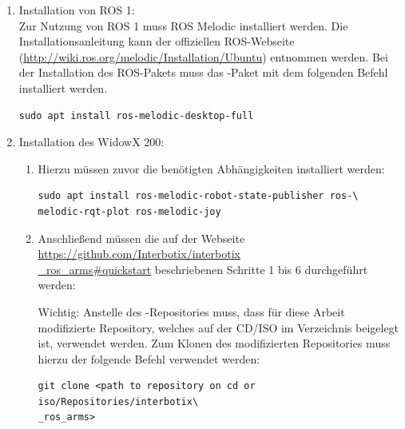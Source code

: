 \begin{enumerate}[label*=\arabic*.]
    \item Installation von ROS 1:\\
    Zur Nutzung von ROS 1 muss ROS Melodic installiert werden. Die Installationsanleitung kann der offiziellen ROS-Webseite (\href{http://wiki.ros.org/melodic/Installation/Ubuntu}{http://wiki.ros.org/melodic/Installation/Ubuntu}) entnommen werden. Bei der Installation des ROS-Pakets muss das -Paket mit dem folgenden Befehl installiert werden.

        \begin{lstlisting}[style=bash]
sudo apt install ros-melodic-desktop-full
        \end{lstlisting}

    \item Installation des WidowX 200:
        \begin{enumerate}[label*=\arabic*.]
            \item Hierzu müssen zuvor die benötigten Abhängigkeiten installiert werden:

                \begin{lstlisting}[style=bash]
sudo apt install ros-melodic-robot-state-publisher ros-\
melodic-rqt-plot ros-melodic-joy
                \end{lstlisting}

            \item Anschließend müssen die auf der Webseite \href{https://github.com/Interbotix/interbotix_ros_arms#quickstart}{https://github.com/Interbotix/interbotix\\\_ros\_arms\#quickstart} beschriebenen Schritte 1 bis 6 durchgeführt werden:

            \begin{redbox}{Wichtig:}
                Anstelle des -Repositories muss, dass für diese Arbeit modifizierte Repository, welches auf der CD/ISO im Verzeichnis  beigelegt ist, verwendet werden. Zum Klonen des modifizierten Repositories muss hierzu der folgende Befehl verwendet werden:

                \begin{lstlisting}[style=bash]
git clone <path to repository on cd or iso/Repositories/interbotix\
_ros_arms>
                \end{lstlisting}
            \end{redbox}


\end{enumerate}
\end{enumerate}
